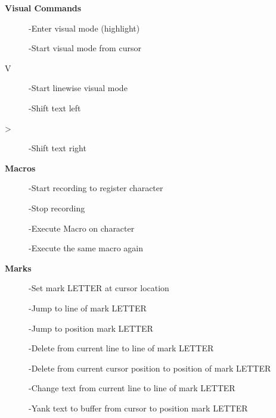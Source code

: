\documentclass{article}
\begin{document}
\begin{multicols}{3}
\begin{center}
\Large\textbf{Visual Commands}
\end{center}
\begin{description}
\item[]
-Enter visual mode	(highlight)
\item[]
-Start visual mode from cursor 
\item[V] \hfill
-Start linewise visual mode
\item[\ttfamily{\textless}] 
-Shift text left
\item[\textgreater] \hfill
-Shift text right
\end{description}
\begin{center}
\Large\textbf{Macros}
\end{center}
\begin{description}
\item[]
-Start recording to register character
\item[]
-Stop recording
\item[]
-Execute Macro on character
\item[]
-Execute the same macro again
\end{description}

\columnbreak

\begin{center}
\Large\textbf{Marks}
\end{center}
\begin{description}
\item[]
-Set mark LETTER at cursor location
\item[]
-Jump to line of mark LETTER
\item[]
-Jump to position mark LETTER
\item[]
-Delete from current line to line of mark LETTER
\item[]
-Delete from current cursor position to position of mark LETTER
\item[]
-Change text from current line to line of mark LETTER
\item[]
-Yank text to buffer from cursor to position mark LETTER
\end{description}


\end{multicols}
\end{document}
